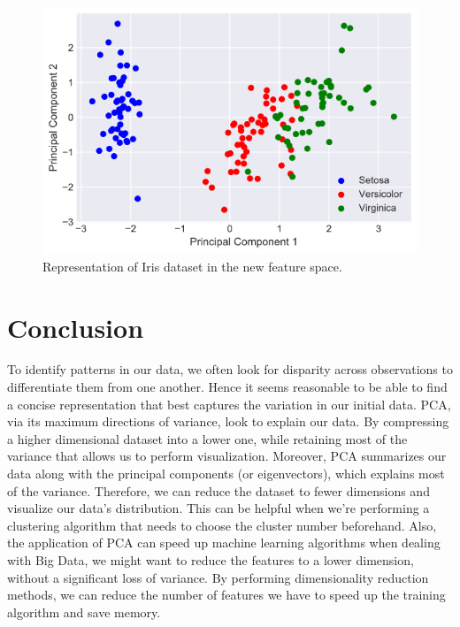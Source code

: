 \documentclass[conference]{IEEEtran}
\begin{document}
\begin{figure}[h]
\centerline{\includegraphics[scale=0.4]{Figures/PC1_PC2_dark.png}}
\caption{Representation of Iris dataset in the new feature space.}
\label{fig}
\end{figure}


\section{Conclusion}

To identify patterns in our data, we often look for disparity across observations to differentiate them from one another. Hence it seems reasonable to be able to find a concise representation that best captures the variation in our initial data. PCA, via its maximum directions of variance, look to explain our data. By compressing a higher dimensional dataset into a lower one, while retaining most of the variance that allows us to perform visualization. Moreover, PCA summarizes our data along with the principal components (or eigenvectors), which explains most of the variance. Therefore, we can reduce the dataset to fewer dimensions and visualize our data's distribution. This can be helpful when we're performing a clustering algorithm that needs to choose the cluster number beforehand. Also, the application of PCA can speed up machine learning algorithms when dealing with Big Data, we might want to reduce the features to a lower dimension, without a significant loss of variance. By performing dimensionality reduction methods, we can reduce the number of features we have to speed up the training algorithm and save memory. 
\end{document}

